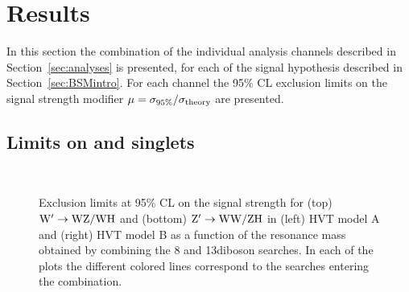 \section{Results}\label{sec:comboResults}

In this section the combination of the individual analysis channels described in Section~\ref{sec:analyses} is presented, for each of the signal hypothesis described in Section~\ref{sec:BSMintro}.
For each channel the 95\% CL exclusion limits on the signal strength modifier $\mu = \sigma_{95\%}/\sigma_{\rm theory}$ are presented.

\subsection{Limits on \Wpr and \Zpr singlets}

\begin{figure}[!htb]
\centering
{}
\\
\caption{%
Exclusion limits at 95\% CL on the signal strength for (top) $\mathrm{W}^\prime\to\mathrm{W}\mathrm{Z}/\mathrm{W}\mathrm{H}$ and (bottom) $\mathrm{Z}^\prime\to\mathrm{W}\mathrm{W}/\mathrm{Z}\mathrm{H}$ in (left) HVT model A and (right) HVT model B as a function of the resonance mass obtained by combining the 8 and 13\TeV diboson searches. In each of the plots the different colored lines correspond to the searches entering the combination.}
\label{fig:wpall_138TeV}
\end{figure}

